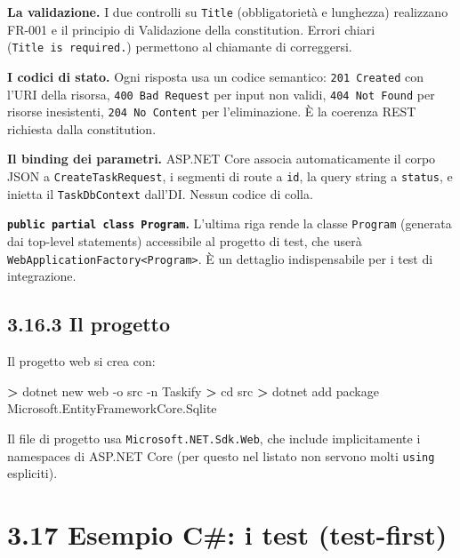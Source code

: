 \documentclass[
  italian,
  10pt,
]{book}
\newenvironment{Shaded}{\begin{snugshade}}{\end{snugshade}}
\newcommand{\AttributeTok}[1]{\textcolor[rgb]{0.13,0.29,0.53}{#1}}
\newcommand{\ExtensionTok}[1]{#1}
\newcommand{\NormalTok}[1]{#1}
\newcommand{\OperatorTok}[1]{\textcolor[rgb]{0.81,0.36,0.00}{\textbf{#1}}}
\begin{document}
\textbf{La validazione.} I due controlli su \texttt{Title}
(obbligatorietà e lunghezza) realizzano FR-001 e il principio di
Validazione della constitution. Errori chiari
(\texttt{Title\ is\ required.}) permettono al chiamante di correggersi.

\textbf{I codici di stato.} Ogni risposta usa un codice semantico:
\texttt{201\ Created} con l'URI della risorsa,
\texttt{400\ Bad\ Request} per input non validi,
\texttt{404\ Not\ Found} per risorse inesistenti,
\texttt{204\ No\ Content} per l'eliminazione. È la coerenza REST
richiesta dalla constitution.

\textbf{Il binding dei parametri.} ASP.NET Core associa automaticamente
il corpo JSON a \texttt{CreateTaskRequest}, i segmenti di route a
\texttt{id}, la query string a \texttt{status}, e inietta il
\texttt{TaskDbContext} dall'DI. Nessun codice di colla.

\textbf{\texttt{public\ partial\ class\ Program}.} L'ultima riga rende
la classe \texttt{Program} (generata dai top-level statements)
accessibile al progetto di test, che userà
\texttt{WebApplicationFactory\textless{}Program\textgreater{}}. È un
dettaglio indispensabile per i test di integrazione.

\subsection{3.16.3 Il progetto}\label{il-progetto}

Il progetto web si crea con:

\begin{Shaded}
\begin{Highlighting}[]
\OperatorTok{\textgreater{}}\NormalTok{ dotnet }\ExtensionTok{new}\NormalTok{ web }\AttributeTok{{-}o}\NormalTok{ src }\AttributeTok{{-}n}\NormalTok{ Taskify}
\OperatorTok{\textgreater{}}\NormalTok{ cd }\ExtensionTok{src}
\OperatorTok{\textgreater{}}\NormalTok{ dotnet }\ExtensionTok{add}\NormalTok{ package Microsoft.EntityFrameworkCore.Sqlite}
\end{Highlighting}
\end{Shaded}

Il file di progetto usa \texttt{Microsoft.NET.Sdk.Web}, che include
implicitamente i namespaces di ASP.NET Core (per questo nel listato non
servono molti \texttt{using} espliciti).

\section{3.17 Esempio C\#: i test
(test-first)}\label{esempio-c-i-test-test-first}
\end{document}
